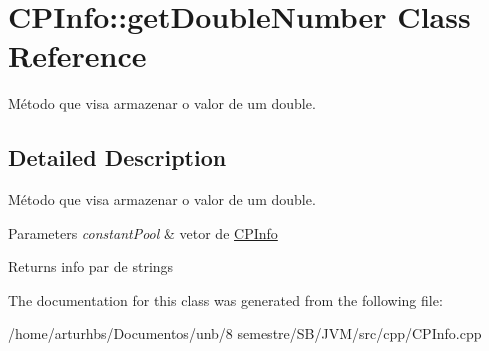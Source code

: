 \hypertarget{classCPInfo_1_1getDoubleNumber}{}\section{C\+P\+Info\+:\+:get\+Double\+Number Class Reference}
\label{classCPInfo_1_1getDoubleNumber}


Método que visa armazenar o valor de um double.  




\subsection{Detailed Description}
Método que visa armazenar o valor de um double. 


\begin{DoxyParams}{Parameters}
{\em constant\+Pool} & vetor de \hyperlink{classCPInfo}{C\+P\+Info} \\
\hline
\end{DoxyParams}
\begin{DoxyReturn}{Returns}
info par de strings 
\end{DoxyReturn}


The documentation for this class was generated from the following file\+:\begin{DoxyCompactItemize}
\item 
/home/arturhbs/\+Documentos/unb/8 semestre/\+S\+B/\+J\+V\+M/src/cpp/C\+P\+Info.\+cpp\end{DoxyCompactItemize}
